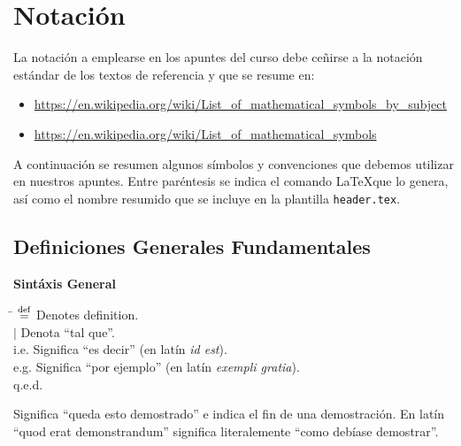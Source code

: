 \documentclass[11pt,letterpaper,twoside]{report}%
\begin{document}
\section{Notación}\label{sec:notacion}

La notación a emplearse en los apuntes del curso debe ceñirse a la notación estándar de los textos de referencia y que se resume en:
\begin{itemize}
\item \url{https://en.wikipedia.org/wiki/List_of_mathematical_symbols_by_subject}
\item \url{https://en.wikipedia.org/wiki/List_of_mathematical_symbols} 
\end{itemize}

A continuación se resumen algunos símbolos y convenciones que debemos utilizar en nuestros apuntes.  Entre paréntesis se indica el comando \LaTeX que lo genera, así como el nombre resumido que se incluye en la plantilla \texttt{header.tex}.

\newlength{\hdiml} %
\newlength{\hdim}  %
\newlength{\lsk}   %
\settowidth{\hdiml}{\hspace{.2\textwidth}}
\settowidth{\hdim }{\hspace{.8\textwidth}}
\setlength{\lsk  }{1.3ex}

\subsection{Definiciones Generales Fundamentales}

{\bf Sintáxis General}
\begin{tabbing}
\hspace{\hdiml} \= \hspace{\hdim} \kill
$\stackrel{\rm def}{=} $    \> Denotes definition.\\[\lsk] %
$|$            \> Denota ``tal que''.\\[\lsk]
i.e.           \> Significa ``es decir'' (en latín {\em id est}).\\[\lsk]
e.g.           \> Significa ``por ejemplo'' (en latín {\em exempli gratia}).\\[\lsk]
q.e.d.         \> \parbox[t]{\hdim}{Significa ``queda esto demostrado'' e indica el fin de una demostración.  En latín ``quod erat demonstrandum'' significa literalemente ``como debíase demostrar''.}\\[\lsk]
\end{tabbing}
\end{document}
